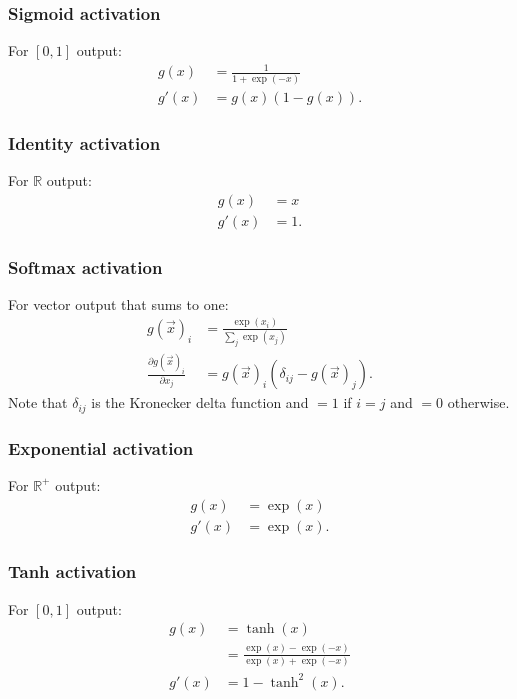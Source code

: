 \subsubsection{Sigmoid activation}
For $[0, 1]$ output:
\begin{align}
    g(x) &= \frac{1}{1 + \exp(-x)} \\
    g'(x) &= g(x)(1 - g(x)).
\end{align}

\subsubsection{Identity activation}
For $\mathbb R$ output:
\begin{align}
    g(x) &= x \\
    g'(x) &= 1.
\end{align}

\subsubsection{Softmax activation}
For vector output that sums to one:
\begin{align}
    g(\vec x)_i                                 &= \frac{\exp(x_i)}{\sum_j \exp(x_j)} \\
    \frac{\partial g(\vec x)_i}{\partial x_j}   &= g(\vec x)_i (\delta_{ij} - g(\vec x)_j).
\end{align}
Note that $\delta_{ij}$ is the Kronecker delta function and $= 1$ if $i = j$ and $= 0$ otherwise.

\subsubsection{Exponential activation}
For $\mathbb R^+$ output:
\begin{align}
    g(x) &= \exp(x) \\
    g'(x) &= \exp(x).
\end{align}

\subsubsection{Tanh activation}
For $[0, 1]$ output:
\begin{align}
    g(x)    &= \tanh(x) \\
            &= \frac{\exp(x) - \exp(-x)}{\exp(x) + \exp(-x)} \\
    g'(x)   &= 1 - \tanh^2(x).
\end{align}

